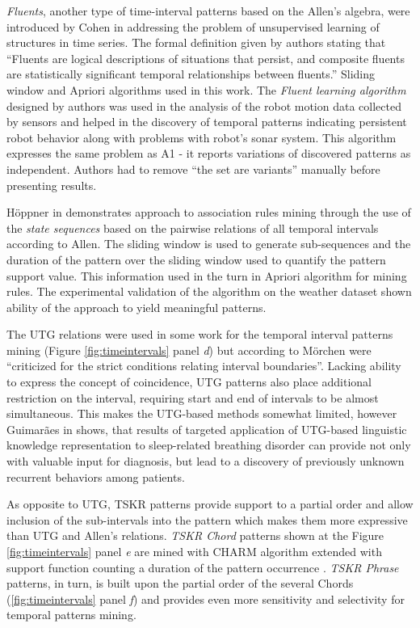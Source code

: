 \textit{Fluents}, another type of time-interval patterns based on the Allen's algebra, were introduced by Cohen in \cite{citeulike:5153756} addressing the problem of unsupervised learning of structures in time series. The formal definition given by authors stating that ``Fluents are logical descriptions of situations that persist, and composite fluents are statistically significant temporal relationships between fluents.'' Sliding window and Apriori algorithms used in this work. The \textit{Fluent learning algorithm} designed by authors was used in the analysis of the robot motion data collected by sensors and helped in the discovery of temporal patterns indicating persistent robot behavior along with problems with robot's sonar system. This algorithm expresses the same problem as A1 - it reports variations of discovered patterns as independent. Authors had to remove ``the set are variants'' manually before presenting results.

H\"{o}ppner in \cite{citeulike:5159615} demonstrates approach to association rules mining through the use of the \textit{state sequences} based on the pairwise relations of all temporal intervals according to Allen. The sliding window is used to generate sub-sequences and the duration of the pattern over the sliding window used to quantify the pattern support value. This information used in the turn in Apriori algorithm for mining rules. The experimental validation of the algorithm on the weather dataset shown ability of the approach to yield meaningful patterns.

The UTG relations were used in some work for the temporal interval patterns mining (Figure \ref{fig:timeintervals} panel \textit{d}) but according to M\"orchen \cite{citeulike:1748833} were ``criticized for the strict conditions relating interval boundaries''. Lacking ability to express the concept of coincidence, UTG patterns also place additional restriction on the interval, requiring start and end of intervals to be almost simultaneous. This makes the UTG-based methods somewhat limited, however Guimar\~{a}es in \cite{citeulike:5159924} shows, that results of targeted application of UTG-based linguistic knowledge representation to sleep-related breathing disorder can provide not only with valuable input for diagnosis, but lead to a discovery of previously unknown recurrent behaviors among patients.

As opposite to UTG, TSKR patterns provide support to a partial order and allow inclusion of the sub-intervals into the pattern which makes them more expressive than UTG and Allen's relations. \textit{TSKR Chord} patterns shown at the Figure \ref{fig:timeintervals} panel \textit{e} are mined with CHARM \cite{citeulike:769773} algorithm extended with support function counting a duration of the pattern occurrence \cite{citeulike:1748833}. \textit{TSKR Phrase} patterns, in turn, is built upon the partial order of the several Chords (\ref{fig:timeintervals} panel \textit{f}) and provides even more sensitivity and selectivity for temporal patterns mining.
